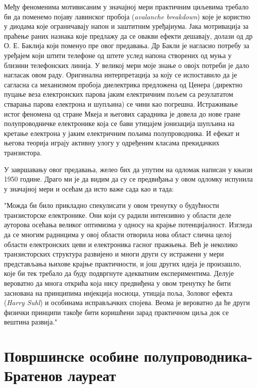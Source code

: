 \documentclass{article}
\begin{document}
Међу феноменима мотивисаним у значајној мери практичним циљевима требало би да поменемо појаву лавинског пробоја (\textit{avalanche breakdown}) које је користно у диодама које ограничавају напон и заштитним уређајиума. Јака мотривација за праћење раних назнака које предлажу да се овакви ефекти дешавају, долази од др О. Е. Баклија који поменуо пре овог предавања. Др Бакли је нагласио потребу за уређајем који штити телефоне од штете услед напона створених од муња у близини телефонских линија. У великој мери моје знање о овојх потреби је дало нагласак овом раду. Оригинална интерпретација за коју се испоставило да је сагласна са механизмом пробоја диелектрика предложена од Ценера (директно пуцање веза електронских парова јаким електричним пољем са  резулататом стварања парова електрона и шупљина) се чини као погрешна. Истраживање истог феномена од стране Мкеја и његових сарадника је довела до нове гране полупроводничке електронике која се бави утицајем јонизација шупљина на кретање електрона у јаким електричним пољима полупроводника. И ефекат и његова теорија играју активну улогу у одређеним класама прекидачких транзистора.

У завршавању овог предавања, желео бих да упутим на одломак написан у књизи 1950 године. Драго ми је да видим да су се предвиђања у овом одломку испунила у значајној мери и осећам да исто важе сада као и тада:

"Можда би било прикладно спекулисати у овом тренутку о будућности транзисторске електронике. Они који су радили интензивно у области деле ауторова осећања великог оптимизма у односу на крајње потенцијалност. Изгледа да се многим радницима у овој области отворила нова област слична целој области електронских цеви и електроника гасног пражњења. Већ је неколико транзисторских структура развијено и многи други су истражени у мери представљања њихове крајње практичности, и још других идеја је произашло, које би тек требало да буду подвргнуте адекватним експериментима. Делује вероватно да многа открића која нису предвиђена у овом тренутку ће бити заснована на принципима инјекција носиоца, утицаја поља, Золовог ефекта (\textit{Harry Suhl}) и особинама исправљачких спојева. Веома је вероватно да ће други физички принципи такође бити коришћени зарад практичном циља док се вештина развија."

\section{Површинске особине полупроводника- Братенов лауреат}
\end{document}
